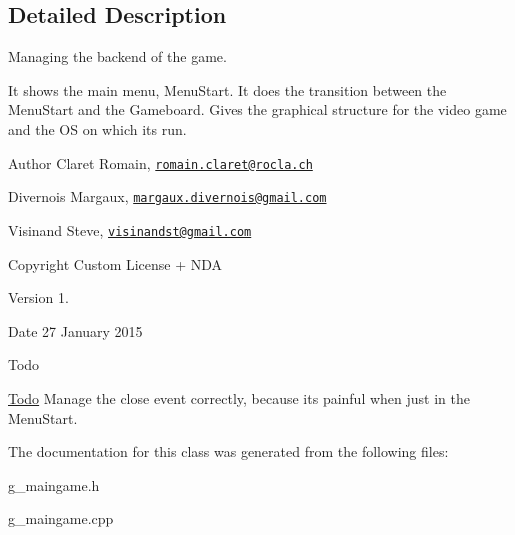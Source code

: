 \subsection{Detailed Description}
Managing the backend of the game. 

It shows the main menu, Menu\+Start. It does the transition between the Menu\+Start and the Gameboard. Gives the graphical structure for the video game and the O\+S on which it\textquotesingle{}s run. \begin{DoxyAuthor}{Author}
Claret Romain, \href{mailto:romain.claret@rocla.ch}{\tt romain.\+claret@rocla.\+ch} 

Divernois Margaux, \href{mailto:margaux.divernois@gmail.com}{\tt margaux.\+divernois@gmail.\+com} 

Visinand Steve, \href{mailto:visinandst@gmail.com}{\tt visinandst@gmail.\+com} 
\end{DoxyAuthor}
\begin{DoxyCopyright}{Copyright}
Custom License + N\+D\+A 
\end{DoxyCopyright}
\begin{DoxyVersion}{Version}
1. 
\end{DoxyVersion}
\begin{DoxyDate}{Date}
27 January 2015 
\end{DoxyDate}
\begin{DoxyRefDesc}{Todo}
\item[\hyperlink{todo__todo000007}{Todo}]Manage the close event correctly, because it\textquotesingle{}s painful when just in the Menu\+Start. \end{DoxyRefDesc}


The documentation for this class was generated from the following files\+:\begin{DoxyCompactItemize}
\item 
g\+\_\+maingame.\+h\item 
g\+\_\+maingame.\+cpp\end{DoxyCompactItemize}
